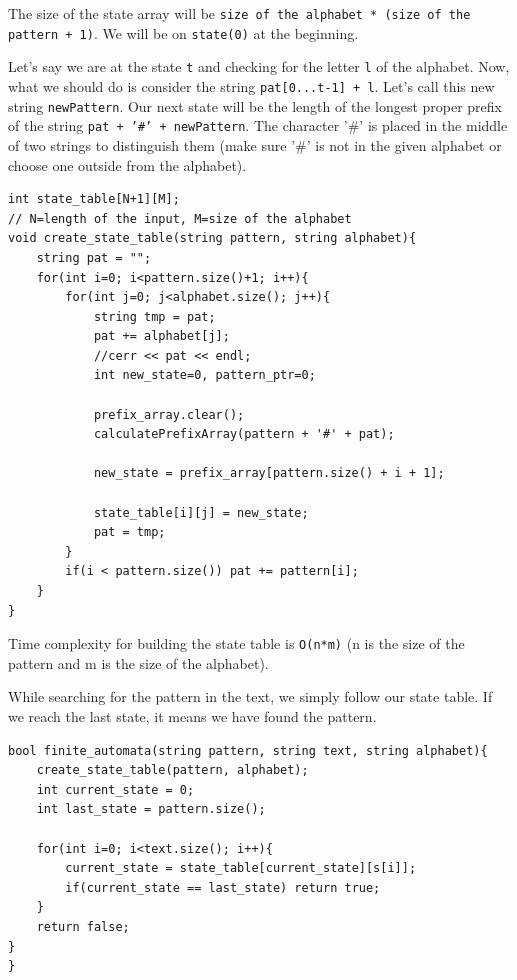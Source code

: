 \documentclass[12pt]{article}
\begin{document}
        The size of the state array will be \texttt{size of the alphabet * (size of the pattern + 1)}. We will be on \texttt{state(0)} at the beginning.
        
        Let's say we are at the state \texttt{t} and checking for the letter \texttt{l} of the alphabet. Now, what we should do is consider the string \texttt{pat[0...t-1] + l}. Let's call this new string \texttt{newPattern}. Our next state will be the length of the longest proper prefix of the string \texttt{pat + '#' + newPattern}. The character '#' is placed in the middle of two strings to distinguish them (make sure '#' is not in the given alphabet or choose one outside from the alphabet).
        
        \begin{verbatim}
int state_table[N+1][M];
// N=length of the input, M=size of the alphabet
void create_state_table(string pattern, string alphabet){
	string pat = "";
	for(int i=0; i<pattern.size()+1; i++){
		for(int j=0; j<alphabet.size(); j++){
			string tmp = pat;
			pat += alphabet[j];
			//cerr << pat << endl;
			int new_state=0, pattern_ptr=0;

			prefix_array.clear();
			calculatePrefixArray(pattern + '#' + pat);

			new_state = prefix_array[pattern.size() + i + 1];
			
			state_table[i][j] = new_state;
			pat = tmp;
		}
		if(i < pattern.size()) pat += pattern[i];
	}
}
        \end{verbatim}
    	
    	Time complexity for building the state table is \texttt{O(n*m)} (n is the size of the pattern and m is the size of the alphabet).
    	
        \newpage
        
    	While searching for the pattern in the text, we simply follow our state table. If we reach the last state, it means we have found the pattern.
    	
    	\begin{verbatim}
bool finite_automata(string pattern, string text, string alphabet){
	create_state_table(pattern, alphabet);
	int current_state = 0;
	int last_state = pattern.size();
	
	for(int i=0; i<text.size(); i++){
		current_state = state_table[current_state][s[i]];
		if(current_state == last_state) return true;
	}
	return false;
}
}
        \end{verbatim}
        
\end{document}

